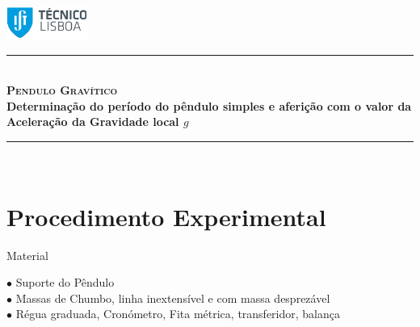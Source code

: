 \documentclass[a4paper,12pt]{article}      %
\author{Prof. Bernardo B. Carvalho}
\date{ Setembro 2012}
\newcommand{\HRule}{\rule{\linewidth}{0.5mm}}
\begin{document}
 


\includegraphics[width=0.2\textwidth]{../../logo-ist}%
	
	\HRule \\[0.5cm]
	{ \huge   \bfseries \textsc{ Pendulo Gravítico } }\\[0.4cm]
	{ \large \bfseries Determinação do período do pêndulo simples e aferição com o valor da Aceleração da Gravidade local $g$  }\\
	\HRule \\%
	
%	 



\section{\sf Procedimento Experimental}
{ \large Material }
 \begin{flushleft}
	 $\bullet$ Suporte do Pêndulo \\
	 $\bullet$ Massas de Chumbo, linha inextensível e com massa desprezável \\
	 $\bullet$ Régua graduada, Cronómetro, Fita métrica, transferidor, balança
\end{flushleft} 
\end{document}
